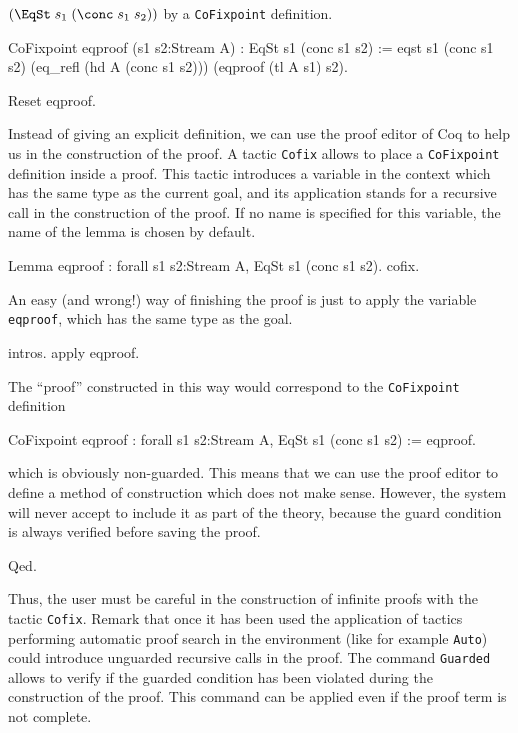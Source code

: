\noindent $(\EqSt\;s_1\;(\conc\;s_1\;s_2))$ by a \verb!CoFixpoint!
definition.
\begin{coq_example}
CoFixpoint eqproof (s1 s2:Stream A) : EqSt s1 (conc s1 s2) :=
  eqst s1 (conc s1 s2) (eq_refl (hd A (conc s1 s2)))
    (eqproof (tl A s1) s2).
\end{coq_example}
\begin{coq_eval}
Reset eqproof.
\end{coq_eval}
\noindent Instead of giving an explicit definition, 
we can use the proof editor of Coq to help us in 
the construction of the proof.
A tactic \verb!Cofix! allows to place a \verb!CoFixpoint! definition
inside a proof. 
This tactic introduces a variable in the context which has
the same type as the current goal, and its application stands
for a recursive call in the construction of the proof. If no name is
specified for this variable, the name of the lemma  is chosen by
default.

\begin{coq_example}
Lemma eqproof : forall s1 s2:Stream A, EqSt s1 (conc s1 s2).
cofix.
\end{coq_example}

\noindent An easy (and wrong!) way of finishing the proof is just to apply the
variable \verb!eqproof!, which has the same type as the goal. 

\begin{coq_example}
intros.
apply eqproof.
\end{coq_example}

\noindent The ``proof'' constructed in this way 
would correspond to the \verb!CoFixpoint! definition
\begin{coq_example*}
CoFixpoint eqproof  : forall s1 s2:Stream A, EqSt s1 (conc s1 s2) :=
  eqproof.
\end{coq_example*}

\noindent which is obviously non-guarded. This means that 
we can use the proof editor to
define a method of construction which does not make sense. However,
the system will never accept to include it as part of the theory,
because the guard condition is always verified before saving the proof.

\begin{coq_example}
Qed.
\end{coq_example}

\noindent Thus, the user must be careful in the 
construction of infinite proofs 
with the tactic \verb!Cofix!. Remark that once it has been used 
the application of tactics performing automatic proof search in 
the environment (like for example \verb!Auto!)
could introduce unguarded recursive calls in the proof.
The command \verb!Guarded! allows to verify 
if the guarded condition has been violated 
during the construction of the proof. This command can be
applied even if the proof term is not complete.



